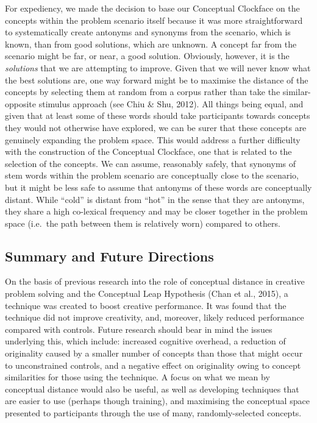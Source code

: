 \documentclass[english,man]{apa6}
\begin{document}
For expediency, we made the decision to base our Conceptual Clockface on
the concepts within the problem scenario itself because it was more
straightforward to systematically create antonyms and synonyms from the
scenario, which is known, than from good solutions, which are unknown. A
concept far from the scenario might be far, or near, a good solution.
Obviously, however, it is the \emph{solutions} that we are attempting to
improve. Given that we will never know what the best solutions are, one
way forward might be to maximise the distance of the concepts by
selecting them at random from a corpus rather than take the
similar-opposite stimulus approach (see Chiu \& Shu, 2012). All things
being equal, and given that at least some of these words should take
participants towards concepts they would not otherwise have explored, we
can be surer that these concepts are genuinely expanding the problem
space. This would address a further difficulty with the construction of
the Conceptual Clockface, one that is related to the selection of the
concepts. We can assume, reasonably safely, that synonyms of stem words
within the problem scenario are conceptually close to the scenario, but
it might be less safe to assume that antonyms of these words are
conceptually distant. While \enquote{cold} is distant from \enquote{hot}
in the sense that they are antonyms, they share a high co-lexical
frequency and may be closer together in the problem space (i.e.~the path
between them is relatively worn) compared to others.

\hypertarget{summary-and-future-directions}{%
\subsection{Summary and Future
Directions}\label{summary-and-future-directions}}

On the basis of previous research into the role of conceptual distance
in creative problem solving and the Conceptual Leap Hypothesis (Chan et
al., 2015), a technique was created to boost creative performance. It
was found that the technique did not improve creativity, and, moreover,
likely reduced performance compared with controls. Future research
should bear in mind the issues underlying this, which include: increased
cognitive overhead, a reduction of originality caused by a smaller
number of concepts than those that might occur to unconstrained
controls, and a negative effect on originality owing to concept
similarities for those using the technique. A focus on what we mean by
conceptual distance would also be useful, as well as developing
techniques that are easier to use (perhaps though training), and
maximising the conceptual space presented to participants through the
use of many, randomly-selected concepts.
\end{document}
